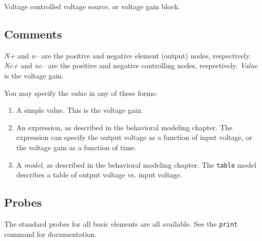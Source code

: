 Voltage controlled voltage source, or voltage gain block.
\subsection{Comments}

{\it N+} and {\it n--} are the positive and negative element (output) nodes,
respectively.  {\it Nc+} and {\it nc--} are the positive and negative
controlling nodes, respectively.  {\it Value} is the voltage gain.

You may specify the {\it value} in any of these forms:

\begin{enumerate}
  
\item
A simple value.  This is the voltage gain.
  
\item
An expression, as described in the behavioral modeling chapter.  The
expression can specify the output voltage as a function of input
voltage, or the voltage gain as a function of time.

\item
A {\it model}, as described in the behavioral modeling chapter.  The
{\tt table} model describes a table of output voltage vs. input
voltage.

\end{enumerate}
\subsection{Probes}

The standard probes for all basic elements are all available.  See the
{\tt print} command for documentation.
